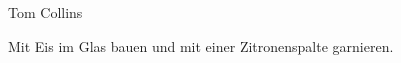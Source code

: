 \documentclass[../recipe-collections/cocktails.tex]{subfiles}
\begin{document}
\begin{recipe}{Tom Collins}{}{}

  \freeform{}\textit{}


  Mit Eis im Glas bauen und mit einer Zitronenspalte garnieren.

  \freeform{}\hrulefill{}

\end{recipe}
\end{document}
